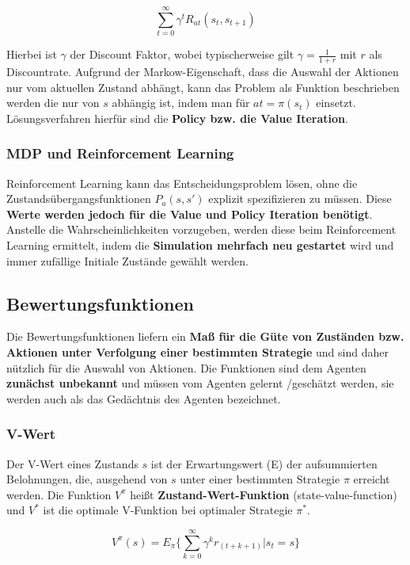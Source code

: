 \documentclass[10pt]{scrartcl}
\begin{document}
\begin{equation}
\sum_{t=0}^\infty \gamma^t R_{at}(s_{t}, s_{t+1})
\end{equation}

Hierbei ist $\gamma$ der Discount Faktor, wobei typischerweise gilt $\gamma = \frac{1}{1+r}$ mit $r$ als Discountrate. Aufgrund der Markow-Eigenschaft, dass die Auswahl der Aktionen nur vom aktuellen Zustand abhängt, kann das Problem als Funktion beschrieben werden die nur von $s$ abhängig ist, indem man für $at= \pi(s_{t})$ einsetzt. Lösungsverfahren hierfür sind die \textbf{Policy bzw. die Value Iteration}.

\subsubsection{MDP und Reinforcement Learning}
Reinforcement Learning kann das Entscheidungsproblem lösen, ohne die Zustandsübergangsfunktionen $P_{a}(s,s')$ explizit spezifizieren zu müssen. Diese \textbf{Werte werden jedoch für die Value und Policy Iteration benötigt}.\\
Anstelle die Wahrscheinlichkeiten vorzugeben, werden diese beim Reinforcement Learning ermittelt, indem die \textbf{Simulation mehrfach neu gestartet} wird und immer zufällige Initiale Zustände gewählt werden.

\subsection{Bewertungsfunktionen}
Die Bewertungsfunktionen liefern ein \textbf{Maß für die Güte von Zuständen bzw. Aktionen unter Verfolgung einer bestimmten Strategie} und sind daher nützlich für die Auswahl von Aktionen. Die Funktionen sind dem Agenten \textbf{zunächst unbekannt} und müssen vom Agenten gelernt /geschätzt werden, sie werden auch als das Gedächtnis des Agenten bezeichnet.

\subsubsection{V-Wert}
Der V-Wert eines Zustands $s$ ist der Erwartungswert (E) der aufsummierten Belohnungen, die, ausgehend von $s$ unter einer bestimmten Strategie $\pi$ erreicht werden. Die Funktion $V^{\pi}$ heißt \textbf{Zustand-Wert-Funktion} (state-value-function) und $V^{*}$ ist die optimale V-Funktion bei optimaler Strategie $\pi^{*}$.

\begin{equation}
V^{\pi}(s)= E_{\pi} \{ \sum_{k=0}^\infty \gamma^k r_{(t+k+1)} | s_{t}=s \}
\end{equation}
\end{document}

